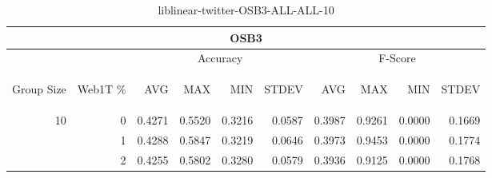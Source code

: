 \begin{center}
\begin{table}[htbp]
\begin{tabular}{ | r | r | r | r | r | r | r | r | r | r |}
\hline
\multicolumn{10}{|c|}{OSB3}\\
\hline
 & & \multicolumn{4}{|c|}{Accuracy} & \multicolumn{4}{|c|}{F-Score}\\ \cline{3-10}
\begin{sideways}Group Size\end{sideways} & \begin{sideways}Web1T \%\end{sideways} & \begin{sideways}AVG\end{sideways} & \begin{sideways}MAX\end{sideways} & \begin{sideways}MIN\end{sideways} & \begin{sideways}STDEV\end{sideways} & \begin{sideways}AVG\end{sideways} & \begin{sideways}MAX\end{sideways} & \begin{sideways}MIN\end{sideways} & \begin{sideways}STDEV\end{sideways}\\
\hline
\multirow{2}{*}{10}
 & 0 & 0.4271 & 0.5520 & 0.3216 & 0.0587 & 0.3987 & 0.9261 & 0.0000 & 0.1669\\ \cline{2-10}
 & 1 & 0.4288 & 0.5847 & 0.3219 & 0.0646 & 0.3973 & 0.9453 & 0.0000 & 0.1774\\ \cline{2-10}
 & 2 & 0.4255 & 0.5802 & 0.3280 & 0.0579 & 0.3936 & 0.9125 & 0.0000 & 0.1768\\ \cline{2-10}
\hline
\end{tabular}
\caption{liblinear-twitter-OSB3-ALL-ALL-10}
\label{table:liblinear-twitter-OSB3-ALL-ALL-10}
\end{table}
\end{center}

